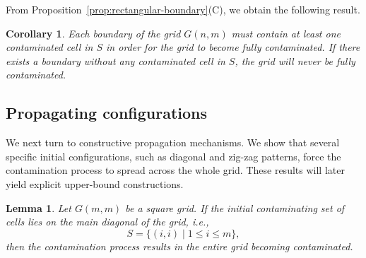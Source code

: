 \documentclass[letterpaper,12pt]{article}
\newtheorem{lemma}{Lemma}
\newtheorem{corollary}{Corollary}
\begin{document}
 

 


 


 


 






 


From Proposition~\ref{prop:rectangular-boundary}(C), we obtain the following result.
\begin{corollary} \label{coro:boundary}
    Each boundary of the grid $G(n,m)$ must contain at least one contaminated cell in $S$ in order for the grid to become fully contaminated.  
    If there exists a  boundary without any contaminated cell in $S$, the grid will never be fully contaminated.
\end{corollary}


\subsection{Propagating configurations}
We next turn to constructive propagation mechanisms. We show that several specific initial configurations, such as diagonal and zig-zag patterns, force the contamination process to spread across the whole grid. These results will later yield explicit upper-bound constructions.


\begin{lemma}\label{lem:diagonal-square}
Let \( G(m,m) \) be a square grid. If the initial contaminating set of cells lies on the main diagonal of the grid, i.e.,
\[
S = \{(i,i) \mid 1 \leq i \leq m\},
\]
then the contamination process results in the entire grid becoming contaminated.
\end{lemma}
\end{document}
